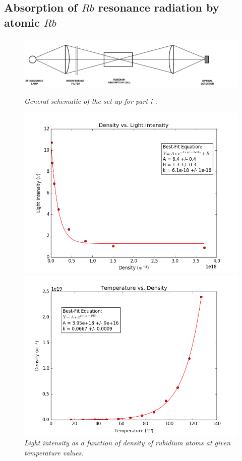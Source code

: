 \documentclass[twocolumn]{article}
\begin{document}
\subsection{Absorption of $Rb$ resonance radiation by atomic $Rb$}
\begin{figure}
\begin{minipage}[t]{\textwidth}
\includegraphics[width=\linewidth]{pictures/i-schem.png}
\caption{\textit{General schematic of the set-up for part i \cite{ref:3}.}}
\label{fig:16}
\end{minipage}
\begin{minipage}[t]{0.45\textwidth}
\includegraphics[width=\linewidth]{pictures/density-light.png}
\caption{\textit{Light intensity as a function of density of rubidium atoms at 
given temperature values.}}
\label{fig:17}
\end{minipage}
\hfill
\begin{minipage}[t]{0.45\textwidth}
\includegraphics[width=\linewidth]{pictures/temp-density.png}

\end{minipage}
\end{figure}
\end{document}
